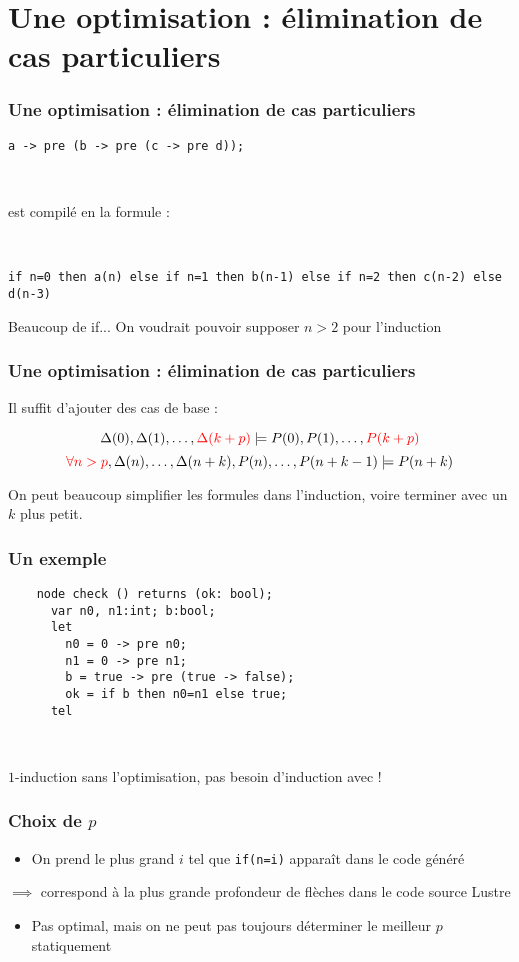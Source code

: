 \documentclass[18pt]{beamer}
\begin{document}
\def\optimisation{Une optimisation : élimination de cas particuliers}
\section{\optimisation}
\begin{frame}[fragile]
	\frametitle{\optimisation}
	
	\texttt{a -> pre (b -> pre (c -> pre d));}
	
	\
	
	est compilé en la formule :
	
	\
	
	\texttt{if n=0 then a(n) else if n=1 then b(n-1) else if n=2 then c(n-2) else d(n-3)}
	
	\bigskip
	
	Beaucoup de if... On voudrait pouvoir supposer $n>2$ pour l'induction
\end{frame}
\begin{frame}
	\frametitle{\optimisation}
	Il suffit d'ajouter des cas de base :
	
	$$\Delta(0), \Delta(1), \ldots, \color{red}\Delta(k+p)\color{black} \models P(0), P(1), \ldots, \color{red}P(k+p)\color{black}$$
	$$\color{red}\forall n>p\color{black}, {\Delta(n), \ldots, \Delta(n+k), P(n), \ldots, P(n+k-1) \models P(n+k)}$$
	
	On peut beaucoup simplifier les formules dans l'induction, voire terminer avec un $k$ plus petit.
\end{frame}
\begin{frame}[fragile]
	\frametitle{Un exemple}
	\begin{lstlisting}
	node check () returns (ok: bool);
	  var n0, n1:int; b:bool;
	  let
	    n0 = 0 -> pre n0;
	    n1 = 0 -> pre n1;
	    b = true -> pre (true -> false);
	    ok = if b then n0=n1 else true;
	  tel
	\end{lstlisting}
	
	\
	
	$1$-induction sans l'optimisation, pas besoin d'induction avec !
\end{frame}
\begin{frame}
	\frametitle{Choix de $p$}
	\begin{itemize}
	\item On prend le plus grand $i$ tel que \texttt{if(n=i)} apparaît dans le code généré
	\end{itemize}
	$\implies$ correspond à la plus grande profondeur de flèches dans le code source Lustre
	
	\begin{itemize}
		\item Pas optimal, mais on ne peut pas toujours déterminer le meilleur $p$ statiquement
	\end{itemize}
\end{frame}
\end{document}
